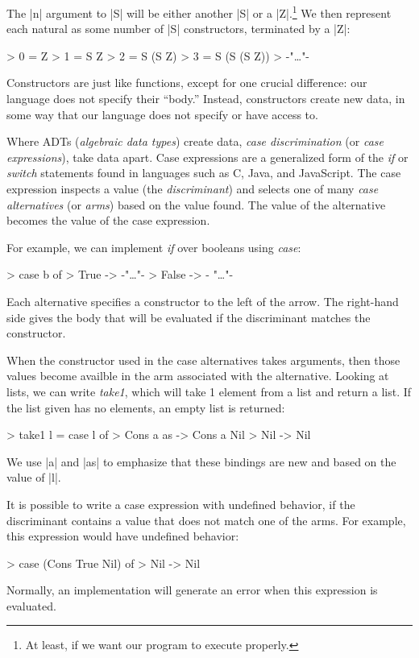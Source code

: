 \documentclass[12pt]{report}
\begin{document}
The |n| argument to |S| will be either another |S| or a
|Z|.\footnote{At least, if we want our program to execute properly.} We
then represent each natural as some number of |S| constructors,
terminated by a |Z|:

> 0 = Z
> 1 = S Z
> 2 = S (S Z)
> 3 = S (S (S Z))
> {-"\ldots"-}

Constructors are just like functions, except for one crucial
difference: our language does not specify their ``body.'' Instead,
constructors create new data, in some way that our language does not
specify or have access to.

Where ADTs (\emph{algebraic data types}) create data, \emph{case
  discrimination} (or \emph{case expressions}), take data apart. Case
expressions are a generalized form of the \emph{if} or \emph{switch}
statements found in languages such as C, Java, and JavaScript. The
case expression inspects a value (the \emph{discriminant}) and selects
one of many \emph{case alternatives} (or \emph{arms}) based on the value
found. The value of the alternative becomes the value of the case
expression.

For example, we can implement \emph{if} over booleans using \emph{case}:

> case b of
>   True -> {-"\ldots"-}
>   False -> {- "\ldots"-}

Each alternative specifies a constructor to the left of the arrow. The
right-hand side gives the body that will be evaluated if the
discriminant matches the constructor. 

When the constructor used in the case alternatives takes arguments,
then those values become availble in the arm associated with the
alternative.  Looking at lists, we can write \emph{take1}, which
will take 1 element from a list and return a list. If the list
given has no elements, an empty list is returned:

> take1 l = case l of
>             Cons a as -> Cons a Nil
>             Nil -> Nil   

We use |a| and |as| to emphasize that these bindings are new and based on
the value of |l|.

It is possible to write a case expression with undefined behavior, if
the discriminant contains a value that does not match one of the arms. For
example, this expression would have undefined behavior:

> case (Cons True Nil) of
>   Nil -> Nil

Normally, an implementation will generate an error when this
expression is evaluated.
\end{document}
